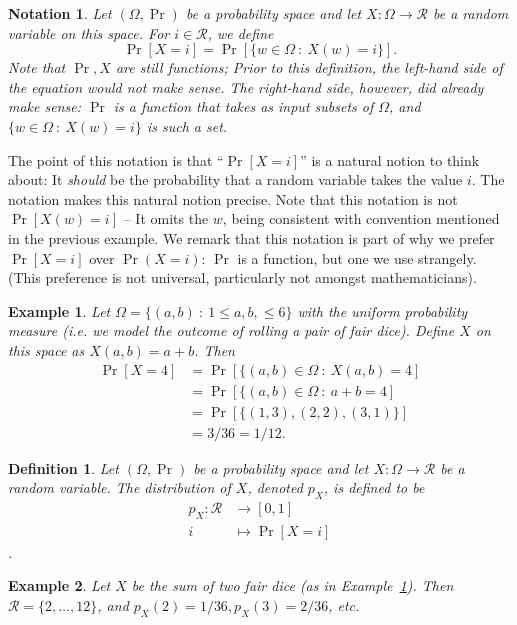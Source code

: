 \documentclass[11pt]{article}
\newtheorem{definition}{Definition}
\newtheorem{notation}{Notation}
\newtheorem{example}{Example}
\newcommand{\rvrange}{\mathcal{R}}
\begin{document}
\begin{notation}
    Let $(\Omega,\Pr)$ be a probability space and let $X:\Omega\to\rvrange$ be
    a random variable on this space.  For $i\in\rvrange$, we define
    \[
        \Pr[X=i] = \Pr[\{w\in\Omega\ : \ X(w)=i\}].
    \]
    Note that $\Pr,X$ are still functions; Prior to this definition,
    the left-hand side of the equation would not make sense.
    The right-hand side, however,  did already make sense: $\Pr$ is a function
    that takes as input subsets of $\Omega$, and $\{w\in\Omega\ : \ X(w)=i\}$
    is such a set.
\end{notation}
The point of this notation is that ``$\Pr[X=i]$'' is a natural notion
to think about: It \emph{should} be the probability that a random variable
takes the value $i$. The notation makes this natural notion precise.
Note that this notation is not $\Pr[X(w)=i]$ -- It omits the $w$, being
consistent with convention mentioned in the previous example.
We remark that this notation is part of why we prefer $\Pr[X=i]$ over
$\Pr(X=i)$: $\Pr$ is a function, but one we use strangely. (This preference
is not universal, particularly not amongst mathematicians).

\begin{example}\label{ex:dicesum}
    Let $\Omega = \{(a,b)\ : \ 1\leq a,b, \leq 6\}$ with the uniform
    probability measure (i.e. we model the outcome of rolling a pair of
    fair dice). Define $X$ on this space as $X(a,b) = a+b$.
    Then
    \begin{align*}
        \Pr[X=4]  
        & = \Pr[\{(a,b)\in\Omega\ : \ X(a,b)=4] \\
        & = \Pr[\{(a,b)\in\Omega\ : \ a+b=4] \\
        & = \Pr[\{(1,3),(2,2),(3,1)\}] \\
        & = 3/36 = 1/12.
    \end{align*}
\end{example}


\begin{definition}
    Let $(\Omega,\Pr)$ be a probability space and let $X:\Omega\to\rvrange$
    be a random variable. The \emph{distribution of $X$}, denoted
    $p_X$, is defined to be
    \begin{align*}
        p_X: \rvrange & \to  [0,1] \\
        i & \mapsto  \Pr[X=i]
    \end{align*}.
\end{definition}

\begin{example}
    Let $X$ be the sum of two fair dice (as in Example~\ref{ex:dicesum}).
    Then $\rvrange = \{2,\ldots,12\}$, and $p_X(2)=1/36, p_X(3)=2/36$, etc.
\end{example}
\end{document}
